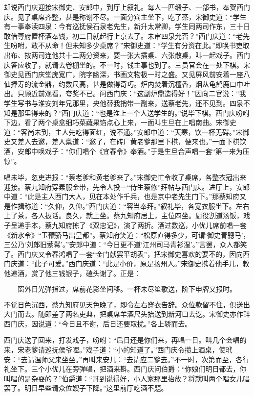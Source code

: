 却说西门庆迎接宋御史、安郎中，到厅上叙礼。每人一匹缎子、一部书，奉贺西门庆。见了桌席齐整，甚是称谢不尽。一面分宾主坐下，吃了茶，宋御史道：“学生有一事奉渎四泉：今有巡抚侯石泉老先生，新升太常卿，学生同两司作东，三十日敢借尊府置杯酒奉饯，初二日就起行上京去了。未审四泉允否？”西门庆道：“老先生吩咐，敢不从命！但未知多少桌席？”宋御史道：“学生有分资在此。”即唤书吏取出布、按两司连他共十二两分资来，要一张大插桌、六张散桌，叫一起戏子。西门庆答应收了，就请去卷棚坐的。不一时，钱主事也到了。三员官会在一处下棋。宋御史见西门庆堂庑宽广，院字幽深，书画文物极一时之盛。又见屏风前安着一座八仙捧寿的流金鼎，约数尺高，甚是做得奇巧。炉内焚着沉檀香，烟从龟鹤鹿口中吐出。只顾近前观看，夸奖不已。问西门庆：“这副炉鼎造得好！”因向二官说：“我学生写书与淮安刘年兄那里，央他替我捎带一副来，送蔡老先，还不见到。四泉不知是那里得来的？”西门庆道：“也是淮上一个人送学生的。”说毕下棋。西门庆吩咐下边，看了两个桌盒细巧菜蔬果馅点心上来，一面叫生旦在上唱南曲。宋御史道：“客尚未到，主人先吃得面红，说不通。”安郎中道：“天寒，饮一杯无碍。”宋御史又差人去邀，差人禀道：“邀了，在砖厂黄老爹那里下棋，便来也。”一面下棋饮酒，安郎中唤戏子：“你们唱个《宜春令》奉酒。”于是生旦合声唱一套“第一来为压惊”。

唱未毕，忽吏进报：“蔡老爹和黄老爹来了。”宋御史忙令收了桌席，各整衣冠出来迎接。蔡九知府穿素服金带，先令人投一“侍生蔡修”拜帖与西门庆。进厅上，安郎中道：“此是主人西门大人，见在本处作千兵，也是京中老先生门下。”那蔡知府又是作揖称道：“久仰，久仰。”西门庆道：“容当奉拜。”叙礼毕，各宽衣服坐下。左右上了茶，各人扳话。良久，就上坐。蔡九知府居上，主位四坐。厨役割道汤饭，戏子呈递手本，蔡九知府拣了《双忠记》，演了两折。酒过数巡，小优儿席前唱一套《新水令》“玉鞭骄马出皇都”。蔡知府笑道：“松原直得多少，可谓‘御史青骢马’，三公乃‘刘郎旧萦髯’。”安郎中道：“今日更不道‘江州司马青衫湿’。”言罢，众人都笑了。西门庆又令春鸿唱了一套“金门献罢平胡表”，把宋御史喜欢的要不的，因向西门庆道：“此子可爱。”西门庆道：“此是小价，原是扬州人。”宋御史携着他手儿，教他递酒，赏了他三钱银子，磕头谢了。正是：

\[
窗外日光弹指过，席前花影坐间移。
一杯未尽笙歌送，阶下申牌又报时。
\]

不觉日色沉西，蔡九知府见天色晚了，即令左右穿衣告辞。众位款留不住，俱送出大门而去。随即差了两名吏典，把桌席羊酒尺头抬送到新河口去讫。宋御史亦作辞西门庆，因说道：“今日且不谢，后日还要取扰。”各上轿而去。

西门庆送了回来，打发戏子，吩咐：“后日还是你们来，再唱一日。叫几个会唱的来，宋老爹请巡抚侯爷哩。”戏子道：“小的知道了。”西门庆令攒上酒桌，使玳安：“去请温师父来坐坐。”再叫来安儿：“去请应二爹去。”不一时，次第而至，各行礼坐下。三个小优儿在旁弹唱，把酒来斟。西门庆问伯爵：“你娘们明日都去，你叫唱的是杂耍的？”伯爵道：“哥到说得好，小人家那里抬放？将就叫两个唱女儿唱罢了。明日早些请众位嫂子下降。”这里前厅吃酒不题。

